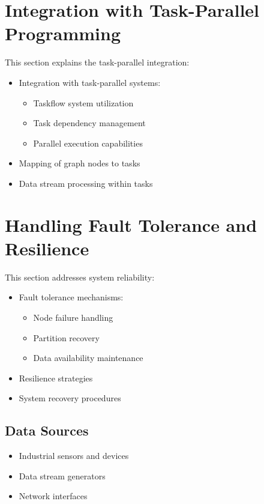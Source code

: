 \section{Integration with Task-Parallel Programming}
This section explains the task-parallel integration:
\begin{itemize}
    \item Integration with task-parallel systems:
        \begin{itemize}
            \item Taskflow system utilization
            \item Task dependency management
            \item Parallel execution capabilities
        \end{itemize}
    \item Mapping of graph nodes to tasks
    \item Data stream processing within tasks
\end{itemize}

\section{Handling Fault Tolerance and Resilience}
This section addresses system reliability:
\begin{itemize}
    \item Fault tolerance mechanisms:
        \begin{itemize}
            \item Node failure handling
            \item Partition recovery
            \item Data availability maintenance
        \end{itemize}
    \item Resilience strategies
    \item System recovery procedures
\end{itemize}

\subsection{Data Sources}
\begin{itemize}
    \item Industrial sensors and devices
    \item Data stream generators
    \item Network interfaces
\end{itemize}

